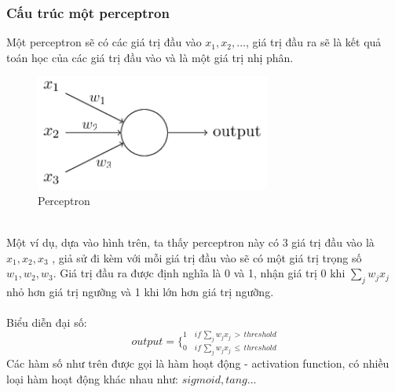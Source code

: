 \subsubsection{Cấu trúc một perceptron}
Một perceptron sẽ có các giá trị đầu vào $x_1, x_2, ...$, giá trị đầu ra sẽ 
là kết quả toán học của các giá trị đầu vào và là một giá trị nhị phân.\\
\begin{figure}[h!]
\centering
\includegraphics[height=1.5in, keepaspectratio=true]{perceptron_n.png}
\caption{Perceptron}
\end{figure}\\
Một ví dụ, dựa vào hình trên, ta thấy perceptron này có 3 giá trị đầu vào là 
$x_1, x_2, x_3$ , giả sử đi kèm với mỗi giá trị đầu vào sẽ có một giá trị trọng 
số $w_1, w_2, w_3$. Giá trị đầu ra được định nghĩa là 0 và 1, nhận giá trị 0 
khi $\sum_j w_j x_j$ nhỏ hơn giá trị ngưỡng và 1 khi lớn hơn giá trị ngưỡng.\\\\
Biểu diễn đại số:\\
\[
  output = 
  \bigg\{
    _{0 \quad if \, \sum_j w_j x_j \, \leq \, threshold}
    ^{1 \quad if \, \sum_j w_j x_j \, > \, threshold}
\]
Các hàm số như trên được gọi là hàm hoạt động - activation function, có nhiều 
loại hàm hoạt động khác nhau như: $sigmoid , tang ...$
